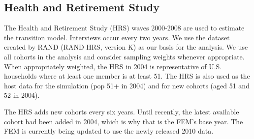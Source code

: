 \subsection{Health and Retirement Study}
The Health and Retirement Study (HRS) waves 2000-2008 are used to estimate the transition model. 
Interviews occur every two years. We use the dataset created by RAND (RAND HRS, version K) as our 
basis for the analysis. We use all cohorts in the analysis and consider sampling weights whenever 
appropriate. When appropriately weighted, the HRS in 2004 is representative of U.S. households where 
at least one member is at least 51. The HRS is also used as the host data for the simulation (pop 51+ in 2004) and for new cohorts (aged 51 and 52 in 2004).

The HRS adds new cohorts every six years. Until recently, the latest available cohort had been added 
in 2004, which is why that is the FEM's base year. The FEM is currently being updated to use the 
newly released 2010 data.

